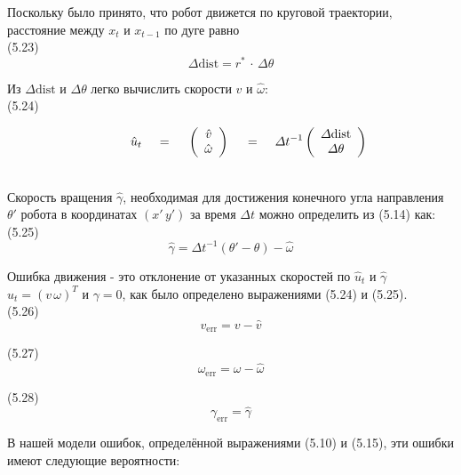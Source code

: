 \documentclass[10pt,a4paper]{article}
\begin{document}
Поскольку было принято, что робот движется по круговой траектории, расстояние между $x_t$ и $x_{t-1}$ по дуге равно\\

(5.23)
$$\varDelta\text{dist}=r^*\,\cdot\,\varDelta\theta$$

Из $\varDelta\text{dist}$ и $\varDelta\theta$ легко вычислить скорости $\hat{v}$ и $\hat{\omega}$:\\

(5.24)
\begin{minipage}{0.3\textwidth}
	\begin{equation*}
	\hspace{10mm}
	\hat{u}_t \hspace{5mm}
	\mbox{=}
	\hspace{5mm}
	\left(\begin{array}{c}
	\hat{v}\\
	\hat{\omega}\\
	\end{array}\right)
	\hspace{5mm}
	\mbox{=}
	\hspace{5mm}
	\varDelta t^{-1}
	\left(\begin{array}{c}
	\varDelta\text{dist}\\
	\varDelta\theta\\
	\end{array}\right)
	\end{equation*}
\end{minipage}\\

Скорость вращения $\hat{\gamma}$, необходимая для достижения конечного угла направления $\theta'$ робота в координатах $(x'\,y')$ за время $\varDelta t$ можно определить из (5.14) как:\\

(5.25)
$$\hat{\gamma}=\varDelta t^{-1}(\theta'-\theta)-\hat{\omega}$$

Ошибка движения - это отклонение от указанных скоростей по $\hat{u}_t$ и $\hat{\gamma}$ 
$u_t = (v\,\omega)^T$ и $\gamma=0$, как было определено выражениями (5.24) и (5.25).\\

(5.26)
$$v_{\text{err}}=v-\hat{v}$$

(5.27)
$$\omega_{\text{err}}=\omega-\hat{\omega}$$

(5.28)
$$\gamma_{\text{err}}=\hat{\gamma}$$

В нашей модели ошибок, определённой выражениями (5.10) и (5.15), эти ошибки имеют следующие вероятности:\\
\end{document}
